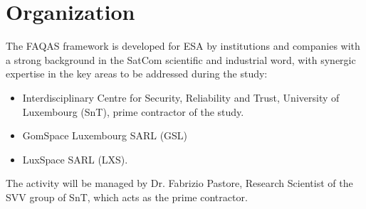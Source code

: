 \chapter{Organization}
\label{chapter:organization}

The FAQAS framework is developed for ESA by institutions and companies with a strong background in the SatCom
scientific and industrial word, with synergic expertise in the key areas to be addressed during
the study:
\begin{itemize}
  \item Interdisciplinary Centre for Security, Reliability and Trust, University of Luxembourg (SnT), prime contractor of the study.
  \item GomSpace Luxembourg SARL (GSL)
  \item LuxSpace SARL (LXS).
\end{itemize}

The activity will be managed by Dr. Fabrizio Pastore, Research Scientist of the SVV group of SnT, which acts as the prime contractor.
